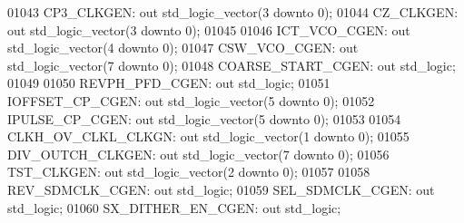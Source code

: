 \begin{DoxyCode}
01043         CP3\_CLKGEN:     \textcolor{keywordflow}{out} \textcolor{comment}{std\_logic\_vector}(\textcolor{vhdllogic}{}\textcolor{vhdllogic}{3} \textcolor{keywordflow}{downto} \textcolor{vhdllogic}{}\textcolor{vhdllogic}{0});
01044         CZ\_CLKGEN:      \textcolor{keywordflow}{out} \textcolor{comment}{std\_logic\_vector}(\textcolor{vhdllogic}{}\textcolor{vhdllogic}{3} \textcolor{keywordflow}{downto} \textcolor{vhdllogic}{}\textcolor{vhdllogic}{0});
01045 
01046         ICT\_VCO\_CGEN:   \textcolor{keywordflow}{out} \textcolor{comment}{std\_logic\_vector}(\textcolor{vhdllogic}{}\textcolor{vhdllogic}{4} \textcolor{keywordflow}{downto} \textcolor{vhdllogic}{}\textcolor{vhdllogic}{0});
01047         CSW\_VCO\_CGEN:   \textcolor{keywordflow}{out} \textcolor{comment}{std\_logic\_vector}(\textcolor{vhdllogic}{}\textcolor{vhdllogic}{7} \textcolor{keywordflow}{downto} \textcolor{vhdllogic}{}\textcolor{vhdllogic}{0});
01048         COARSE\_START\_CGEN:  \textcolor{keywordflow}{out} \textcolor{comment}{std\_logic};
01049 
01050         REVPH\_PFD\_CGEN: \textcolor{keywordflow}{out} \textcolor{comment}{std\_logic};
01051         IOFFSET\_CP\_CGEN:    \textcolor{keywordflow}{out} \textcolor{comment}{std\_logic\_vector}(\textcolor{vhdllogic}{}\textcolor{vhdllogic}{5} \textcolor{keywordflow}{downto} \textcolor{vhdllogic}{}\textcolor{vhdllogic}{0});
01052         IPULSE\_CP\_CGEN: \textcolor{keywordflow}{out} \textcolor{comment}{std\_logic\_vector}(\textcolor{vhdllogic}{}\textcolor{vhdllogic}{5} \textcolor{keywordflow}{downto} \textcolor{vhdllogic}{}\textcolor{vhdllogic}{0});
01053 
01054         CLKH\_OV\_CLKL\_CLKGN: \textcolor{keywordflow}{out} \textcolor{comment}{std\_logic\_vector}(\textcolor{vhdllogic}{}\textcolor{vhdllogic}{1} \textcolor{keywordflow}{downto} \textcolor{vhdllogic}{}\textcolor{vhdllogic}{0});
01055         DIV\_OUTCH\_CLKGEN:   \textcolor{keywordflow}{out} \textcolor{comment}{std\_logic\_vector}(\textcolor{vhdllogic}{}\textcolor{vhdllogic}{7} \textcolor{keywordflow}{downto} \textcolor{vhdllogic}{}\textcolor{vhdllogic}{0});
01056         TST\_CLKGEN:     \textcolor{keywordflow}{out} \textcolor{comment}{std\_logic\_vector}(\textcolor{vhdllogic}{}\textcolor{vhdllogic}{2} \textcolor{keywordflow}{downto} \textcolor{vhdllogic}{}\textcolor{vhdllogic}{0});
01057 
01058         REV\_SDMCLK\_CGEN:    \textcolor{keywordflow}{out} \textcolor{comment}{std\_logic};
01059         SEL\_SDMCLK\_CGEN:    \textcolor{keywordflow}{out} \textcolor{comment}{std\_logic};
01060         SX\_DITHER\_EN\_CGEN:  \textcolor{keywordflow}{out} \textcolor{comment}{std\_logic};

\end{DoxyCode}
